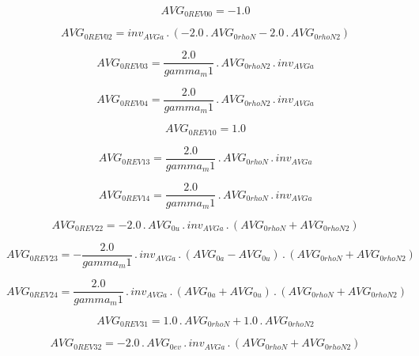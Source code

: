 \documentclass{article}
\begin{document}
\begin{dmath}AVG_{0 REV 00} = -1.0\end{dmath}

\begin{dmath}AVG_{0 REV 02} = inv_{AVG a} \,.\, \left(- 2.0 \,.\, AVG_{0 rhoN} - 2.0 \,.\, AVG_{0 rhoN2}\right)\end{dmath}

\begin{dmath}AVG_{0 REV 03} = \frac{2.0}{gamma_m1} \,.\, AVG_{0 rhoN2} \,.\, inv_{AVG a}\end{dmath}

\begin{dmath}AVG_{0 REV 04} = \frac{2.0}{gamma_m1} \,.\, AVG_{0 rhoN2} \,.\, inv_{AVG a}\end{dmath}

\begin{dmath}AVG_{0 REV 10} = 1.0\end{dmath}

\begin{dmath}AVG_{0 REV 13} = \frac{2.0}{gamma_m1} \,.\, AVG_{0 rhoN} \,.\, inv_{AVG a}\end{dmath}

\begin{dmath}AVG_{0 REV 14} = \frac{2.0}{gamma_m1} \,.\, AVG_{0 rhoN} \,.\, inv_{AVG a}\end{dmath}

\begin{dmath}AVG_{0 REV 22} = - 2.0 \,.\, AVG_{0 u} \,.\, inv_{AVG a} \,.\, \left(AVG_{0 rhoN} + AVG_{0 rhoN2}\right)\end{dmath}

\begin{dmath}AVG_{0 REV 23} = - \frac{2.0}{gamma_m1} \,.\, inv_{AVG a} \,.\, \left(AVG_{0 a} - AVG_{0 u}\right) \,.\, \left(AVG_{0 rhoN} + AVG_{0 rhoN2}\right)\end{dmath}

\begin{dmath}AVG_{0 REV 24} = \frac{2.0}{gamma_m1} \,.\, inv_{AVG a} \,.\, \left(AVG_{0 a} + AVG_{0 u}\right) \,.\, \left(AVG_{0 rhoN} + AVG_{0 rhoN2}\right)\end{dmath}

\begin{dmath}AVG_{0 REV 31} = 1.0 \,.\, AVG_{0 rhoN} + 1.0 \,.\, AVG_{0 rhoN2}\end{dmath}

\begin{dmath}AVG_{0 REV 32} = - 2.0 \,.\, AVG_{0 ev} \,.\, inv_{AVG a} \,.\, \left(AVG_{0 rhoN} + AVG_{0 rhoN2}\right)\end{dmath}
\end{document}
